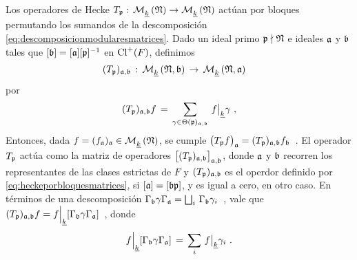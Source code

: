 \begin{obsHeckeActuaPorBloquesMatrices}\label{obs:heckeactuaporbloquesmatrices}
	Los operadores de Hecke
	\begin{math}
		T_{\frak{p}}:\,\modularH{k}{\frak{N}}\rightarrow
			\modularH{k}{\frak{N}}
	\end{math}
	act\'{u}an por bloques permutando los sumandos de la descomposici\'{o}n
	\eqref{eq:descomposicionmodularesmatrices}. Dado un ideal primo
	$\frak{p}\nmid\frak{N}$ e ideales $\frak{a}$ y $\frak{b}$ tales que
	$[\frak{b}]=[\frak{a}][\frak{p}]^{-1}$ en $\pClass{F}$, definimos
	\begin{align*}
		(T_{\frak{p}})_{\frak{a},\frak{b}} & \,:\,
			\modularH{k}{\frak{N},\frak{b}}\,\rightarrow\,
			\modularH{k}{\frak{N},\frak{a}}
	\end{align*}
	por
	\begin{equation}
		\label{eq:heckeporbloquesmatrices}
		(T_{\frak{p}})_{\frak{a},\frak{b}}f \,=\,
			\sum_{\gamma\in\Theta(\frak{p})_{\frak{a},\frak{b}}}\,
				f\operadormatrices{\peso{k}}{\gamma}
		\text{ ,}
	\end{equation}
	Entonces, dada $f=(f_{\frak{a}})_{\frak{a}}\in\modularH{k}{\frak{N}}$,
	se cumple
	\begin{math}
		\big(T_{\frak{p}}f\big)_{\frak{a}}=
			(T_{\frak{p}})_{\frak{a},\frak{b}}f_{\frak{b}}
	\end{math}~.
	El operador $T_{\frak{p}}$ act\'{u}a como la matriz de operadores
	$\big[(T_{\frak{p}})_{\frak{a},\frak{b}}\big]_{\frak{a},\frak{b}}$,
	donde $\frak{a}$ y $\frak{b}$ recorren los representantes de las clases
	estrictas de $F$ y $(T_{\frak{p}})_{\frak{a},\frak{b}}$ es el operdor
	definido por \eqref{eq:heckeporbloquesmatrices}, si
	$[\frak{a}]=[\frak{b}\frak{p}]$, y es igual a cero, en otro caso.
	En t\'{e}rminos de una descomposici\'{o}n
	\begin{math}
		\Gamma_{\frak{b}}\gamma\Gamma_{\frak{a}}=\bigsqcup_{i}\,
			\Gamma_{\frak{b}}\gamma_{i}
	\end{math}~,
	vale que
	\begin{math}
		(T_{\frak{p}})_{\frak{a},\frak{b}}f=
			f\operadorcoclases{\peso{k}}{%
				\Gamma_{\frak{b}}\gamma\Gamma_{\frak{a}}}
	\end{math}~,
	donde
	\begin{equation}
		\label{eq:coclasedobleporbloquesmatrices}
		f\operadorcoclases{\peso{k}}{%
			\Gamma_{\frak{b}}\gamma\Gamma_{\frak{a}}} \,=\,
			\sum_{i}\,f\operadormatrices{\peso{k}}{\gamma_{i}}
		\text{ .}
	\end{equation}
\end{obsHeckeActuaPorBloquesMatrices}

